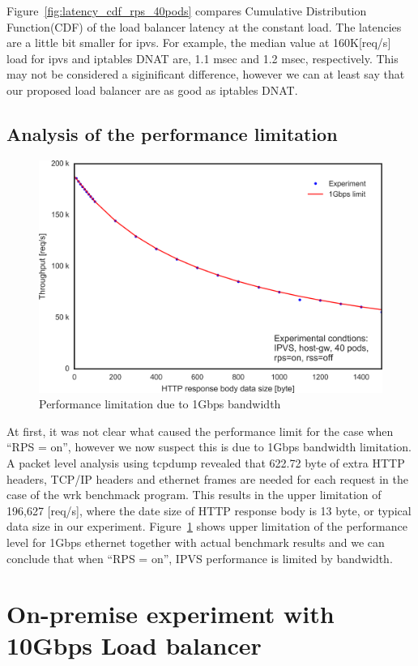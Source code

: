 Figure~\ref{fig:latency_cdf_rps_40pods} compares Cumulative Distribution Function(CDF) of the load balancer latency at the constant load.
The latencies are a little bit smaller for ipvs.
For example, the median value at 160K[req/s] load for ipvs and iptables DNAT are, 1.1 msec and 1.2 msec, respectively.
This may not be considered a siginificant difference, however we can at least say that our proposed load balancer are as good as iptables DNAT.

\subsection{Analysis of the performance limitation}

\begin{figure}
  \centering
  \includegraphics[width=0.8\columnwidth]{Figs/tp_limit_1gbps}
  \caption{Performance limitation due to 1Gbps bandwidth}
  \label{fig:performance_limitation}
\end{figure}

At first, it was not clear what caused the performance limit for the case when \enquote{RPS = on},
however we now suspect this is due to 1Gbps bandwidth limitation.
A packet level analysis using tcpdump\cite{jacobson1989tcpdump} revealed that 622.72 byte of extra HTTP headers, 
TCP/IP headers and ethernet frames are needed for each request in the case of the wrk benchmack program.  
This results in the upper limitation of 196,627 [req/s], where the date size of HTTP response body is 13 byte, or typical data size in our experiment. 
Figure~\ref{fig:performance_limitation} shows upper limitation of the performance level for 1Gbps ethernet together with 
actual benchmark results and we can conclude that when \enquote{RPS = on}, IPVS performance is limited by bandwidth.

\section{On-premise experiment with 10Gbps Load balancer}

